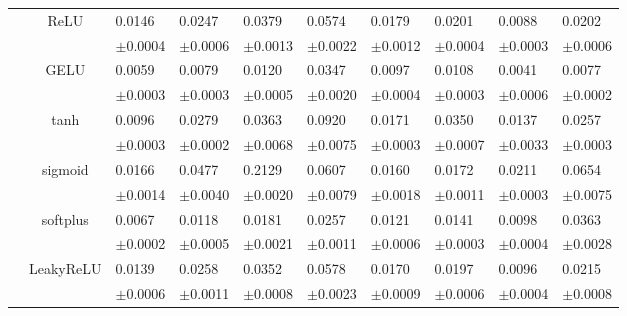 \documentclass{article}
\begin{document}
\begin{table}[h!]
{\begin{tabularx}{\textwidth}{ccXXXXXXXX}
        & \multirow{2}{*}{ReLU}
        & 0.0146 & 0.0247 & 0.0379 & 0.0574 & 0.0179 & 0.0201 & 0.0088 & 0.0202\\
        &&\scriptsize $\pm$0.0004 & \scriptsize $\pm$0.0006 & \scriptsize $\pm$0.0013 & \scriptsize $\pm$0.0022 & \scriptsize $\pm$0.0012 & \scriptsize $\pm$0.0004 & \scriptsize $\pm$0.0003 & \scriptsize $\pm$0.0006\\
        \cline{3-10}\rule{0pt}{2.3ex}

        & \multirow{2}{*}{GELU}
        & 0.0059 & 0.0079 & 0.0120 & 0.0347 & 0.0097 & 0.0108 & 0.0041 & 0.0077\\
        &&\scriptsize $\pm$0.0003 & \scriptsize $\pm$0.0003 & \scriptsize $\pm$0.0005 & \scriptsize $\pm$0.0020 & \scriptsize $\pm$0.0004 & \scriptsize $\pm$0.0003 & \scriptsize $\pm$0.0006 & \scriptsize $\pm$0.0002\\
        \cline{3-10}\rule{0pt}{2.3ex}

        & \multirow{2}{*}{tanh}
        & 0.0096 & 0.0279 & 0.0363 & 0.0920 & 0.0171 & 0.0350 & 0.0137 & 0.0257\\
        &&\scriptsize $\pm$0.0003 & \scriptsize $\pm$0.0002 & \scriptsize $\pm$0.0068 & \scriptsize $\pm$0.0075 & \scriptsize $\pm$0.0003 & \scriptsize $\pm$0.0007 & \scriptsize $\pm$0.0033 & \scriptsize $\pm$0.0003\\
        \cline{3-10}\rule{0pt}{2.3ex}

        & \multirow{2}{*}{sigmoid}
        & 0.0166 & 0.0477 & 0.2129 & 0.0607 & 0.0160 & 0.0172 & 0.0211 & 0.0654\\
        &&\scriptsize $\pm$0.0014 & \scriptsize $\pm$0.0040 & \scriptsize $\pm$0.0020 & \scriptsize $\pm$0.0079 & \scriptsize $\pm$0.0018 & \scriptsize $\pm$0.0011 & \scriptsize $\pm$0.0003 & \scriptsize $\pm$0.0075\\
        \cline{3-10}\rule{0pt}{2.3ex}

        & \multirow{2}{*}{softplus}
        & 0.0067 & 0.0118 & 0.0181 & 0.0257 & 0.0121 & 0.0141 & 0.0098 & 0.0363\\
        &&\scriptsize $\pm$0.0002 & \scriptsize $\pm$0.0005 & \scriptsize $\pm$0.0021 & \scriptsize $\pm$0.0011 & \scriptsize $\pm$0.0006 & \scriptsize $\pm$0.0003 & \scriptsize $\pm$0.0004 & \scriptsize $\pm$0.0028\\
        \cline{3-10}\rule{0pt}{2.3ex}

        & \multirow{2}{*}{LeakyReLU}
        & 0.0139 & 0.0258 & 0.0352 & 0.0578 & 0.0170 & 0.0197 & 0.0096 & 0.0215\\
        &&\scriptsize $\pm$0.0006 & \scriptsize $\pm$0.0011 & \scriptsize $\pm$0.0008 & \scriptsize $\pm$0.0023 & \scriptsize $\pm$0.0009 & \scriptsize $\pm$0.0006 & \scriptsize $\pm$0.0004 & \scriptsize $\pm$0.0008\\        


\end{tabularx}}
\end{table}
\end{document}
